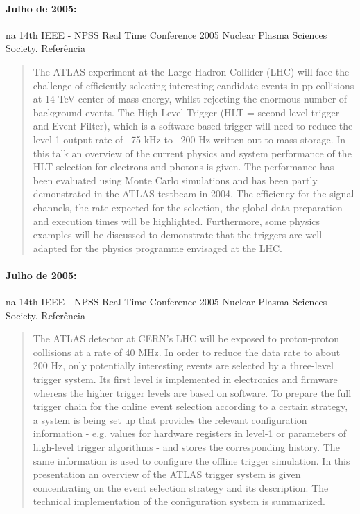 \paragraph{Julho de 2005: } na 14th
IEEE - NPSS Real Time Conference 2005 Nuclear Plasma Sciences
Society. Referência~\cite{aa:rt-05-01}

\begin{quotation}
The ATLAS experiment at the Large Hadron Collider (LHC) will face the
challenge of efficiently selecting interesting candidate events in pp
collisions at 14 TeV center-of-mass energy, whilst rejecting the enormous
number of background events. The High-Level Trigger (HLT = second level
trigger and Event Filter), which is a software based trigger will need to
reduce the level-1 output rate of ~75 kHz to ~200 Hz written out to mass
storage. In this talk an overview of the current physics and system
performance of the HLT selection for electrons and photons is given. The
performance has been evaluated using Monte Carlo simulations and has been
partly demonstrated in the ATLAS testbeam in 2004. The efficiency for the
signal channels, the rate expected for the selection, the global data
preparation and execution times will be highlighted. Furthermore, some physics
examples will be discussed to demonstrate that the triggers are well adapted
for the physics programme envisaged at the LHC.
\end{quotation}

\paragraph{Julho de 2005: } na
14th IEEE - NPSS Real Time Conference 2005 Nuclear Plasma Sciences
Society. Referência~\cite{aa:rt-05}

\begin{quotation}
The ATLAS detector at CERN's LHC will be exposed to proton-proton collisions
at a rate of 40 MHz. In order to reduce the data rate to about 200 Hz, only
potentially interesting events are selected by a three-level trigger
system. Its first level is implemented in electronics and firmware whereas the
higher trigger levels are based on software. To prepare the full trigger chain
for the online event selection according to a certain strategy, a system is
being set up that provides the relevant configuration information -
e.g. values for hardware registers in level-1 or parameters of high-level
trigger algorithms - and stores the corresponding history. The same
information is used to configure the offline trigger simulation. In this
presentation an overview of the ATLAS trigger system is given concentrating on
the event selection strategy and its description. The technical implementation
of the configuration system is summarized.
\end{quotation}

